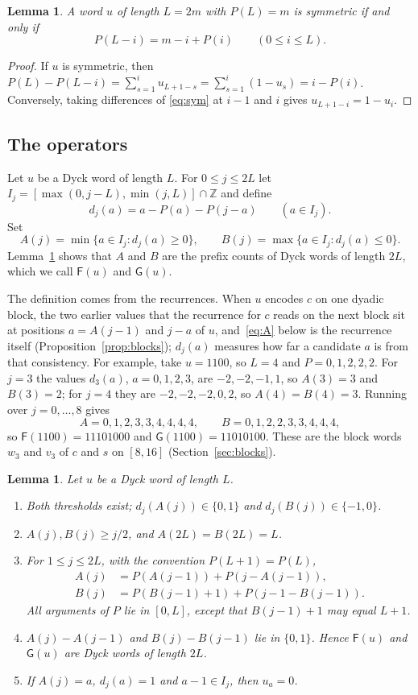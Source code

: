 \documentclass[11pt]{amsart}
\newtheorem{lemma}[proposition]{Lemma}
\theoremstyle{definition}
\theoremstyle{remark}
\numberwithin{equation}{section}
\newcommand{\cF}{\mathsf F}
\newcommand{\cG}{\mathsf G}
\begin{document}
\begin{lemma}\label{lem:sym}
A word $u$ of length $L=2m$ with $P(L)=m$ is symmetric if and only if
\begin{equation}\label{eq:sym}
P(L-i)=m-i+P(i)\qquad(0\le i\le L).
\end{equation}
\end{lemma}

\begin{proof}
If $u$ is symmetric, then $P(L)-P(L-i)=\sum_{s=1}^{i}u_{L+1-s}=\sum_{s=1}^i(1-u_s)=i-P(i)$. Conversely, taking differences of \eqref{eq:sym} at $i-1$ and $i$ gives $u_{L+1-i}=1-u_i$.
\end{proof}

\subsection{The operators} Let $u$ be a Dyck word of length $L$. For $0\le j\le 2L$ let $I_j=[\max(0,j-L),\min(j,L)]\cap\mathbb Z$ and define
\[
d_j(a)=a-P(a)-P(j-a)\qquad(a\in I_j).
\]
Set
\[
A(j)=\min\{a\in I_j: d_j(a)\ge0\},\qquad B(j)=\max\{a\in I_j: d_j(a)\le0\}.
\]
Lemma~\ref{lem:ops} shows that $A$ and $B$ are the prefix counts of Dyck words of length $2L$, which we call $\cF(u)$ and $\cG(u)$.

The definition comes from the recurrences. When $u$ encodes $c$ on one dyadic block, the two earlier values that the recurrence for $c$ reads on the next block sit at positions $a=A(j-1)$ and $j-a$ of $u$, and~\eqref{eq:A} below is the recurrence itself (Proposition~\ref{prop:blocks}); $d_j(a)$ measures how far a candidate $a$ is from that consistency. For example, take $u=1100$, so $L=4$ and $P=0,1,2,2,2$. For $j=3$ the values $d_3(a)$, $a=0,1,2,3$, are $-2,-2,-1,1$, so $A(3)=3$ and $B(3)=2$; for $j=4$ they are $-2,-2,-2,0,2$, so $A(4)=B(4)=3$. Running over $j=0,\dots,8$ gives
\[
A=0,1,2,3,3,4,4,4,4,\qquad B=0,1,2,2,3,3,4,4,4,
\]
so $\cF(1100)=11101000$ and $\cG(1100)=11010100$. These are the block words $w_3$ and $v_3$ of $c$ and $s$ on $[8,16]$ (Section~\ref{sec:blocks}).

\begin{lemma}\label{lem:ops}
Let $u$ be a Dyck word of length $L$.
\begin{enumerate}
\item Both thresholds exist; $d_j(A(j))\in\{0,1\}$ and $d_j(B(j))\in\{-1,0\}$.
\item $A(j),B(j)\ge j/2$, and $A(2L)=B(2L)=L$.
\item For $1\le j\le 2L$, with the convention $P(L+1)=P(L)$,
\begin{align}
A(j)&=P(A(j-1))+P(j-A(j-1)),\label{eq:A}\\
B(j)&=P(B(j-1)+1)+P(j-1-B(j-1)).\label{eq:B}
\end{align}
All arguments of $P$ lie in $[0,L]$, except that $B(j-1)+1$ may equal $L+1$.
\item $A(j)-A(j-1)$ and $B(j)-B(j-1)$ lie in $\{0,1\}$. Hence $\cF(u)$ and $\cG(u)$ are Dyck words of length $2L$.
\item If $A(j)=a$, $d_j(a)=1$ and $a-1\in I_j$, then $u_a=0$.
\end{enumerate}
\end{lemma}
\end{document}

